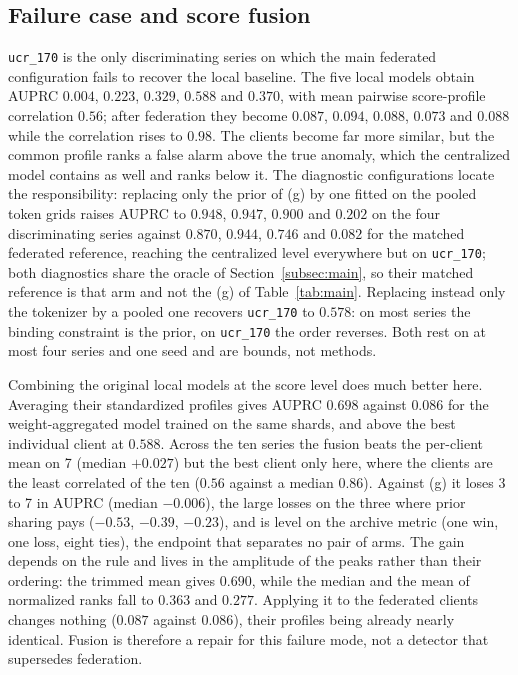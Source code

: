 \documentclass[conference]{IEEEtran}
\begin{document}
\subsection{Failure case and score fusion}
\label{subsec:failure}

\texttt{ucr\_170} is the only discriminating series on which the main federated configuration fails
to recover the local baseline. The five local models obtain AUPRC $0.004$, $0.223$, $0.329$, $0.588$
and $0.370$, with mean pairwise score-profile correlation $0.56$; after federation they become
$0.087$, $0.094$, $0.088$, $0.073$ and $0.088$ while the correlation rises to $0.98$. The clients
become far more similar, but the common profile ranks a false alarm above the true anomaly, which
the centralized model contains as well and ranks below it. The diagnostic configurations locate the
responsibility: replacing only the prior of (g) by one fitted on the pooled token grids raises AUPRC
to $0.948$, $0.947$, $0.900$ and $0.202$ on the four discriminating series against $0.870$, $0.944$,
$0.746$ and $0.082$ for the matched federated reference, reaching the centralized level everywhere
but on \texttt{ucr\_170}; both diagnostics share the oracle of Section~\ref{subsec:main}, so their
matched reference is that arm and not the (g) of Table~\ref{tab:main}. Replacing
instead only the tokenizer by a pooled one recovers
\texttt{ucr\_170} to $0.578$: on most series the binding constraint is the prior, on
\texttt{ucr\_170} the order reverses. Both rest on at most four series and one seed and are bounds,
not methods.

Combining the original local models at the score level does much better here. Averaging their
standardized profiles gives AUPRC $0.698$ against $0.086$ for the weight-aggregated model trained on
the same shards, and above the best individual client at $0.588$. Across the ten series the fusion
beats the per-client mean on 7 (median $+0.027$) but the best client only here, where the clients
are the least correlated of the ten ($0.56$ against a median $0.86$). Against (g) it loses 3 to 7
in AUPRC (median $-0.006$), the large losses on the three where prior sharing pays ($-0.53$,
$-0.39$, $-0.23$), and is level on the archive metric (one win, one loss, eight ties), the endpoint that
separates no pair of arms.
The gain depends on the rule and lives in the
amplitude of the peaks rather than their ordering: the trimmed mean gives $0.690$, while the median
and the mean of normalized ranks fall to $0.363$ and $0.277$. Applying it to the federated clients
changes nothing ($0.087$ against $0.086$), their profiles being already nearly identical. Fusion is
therefore a repair for this failure mode, not a detector that supersedes federation.
\end{document}
